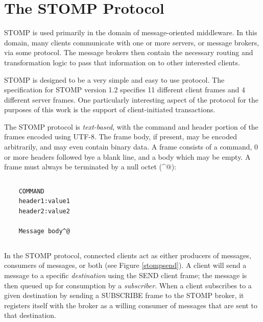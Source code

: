 \documentclass[conference, letterpaper]{IEEEtran}
\begin{document}
\section{The STOMP Protocol}

STOMP is used primarily in the domain of message-oriented middleware. In this domain, many clients
communicate with one or more servers, or message brokers, via some protocol. The message brokers then contain the necessary routing and transformation logic to pass that information on to other interested clients.

STOMP is designed to be a very simple and easy to use protocol. The specification for STOMP version 1.2 specifies 11 different client frames and 4 different server frames. One particularly interesting aspect of the protocol for the purposes of this work is the support of client-initiated transactions.

The STOMP protocol is \textit{text-based}, with the command and header portion of the frames encoded using UTF-8. The frame body, if present, may be encoded arbitrarily, and may even contain binary data. A frame consists of a command, 0 or more headers followed bye a blank line, and a body which may be empty. A frame must always be terminated by a null octet (\^{}@):

\begin{verbatim}
\end{verbatim}
\begin{verbatim}
    COMMAND
    header1:value1
    header2:value2

    Message body^@
\end{verbatim}
\begin{verbatim}
\end{verbatim}

In the STOMP protocol, connected clients act as either producers of messages, consumers of messages, or both (see Figure \ref{stompsend}). A client will send a message to a specific \textit{destination} using the SEND client frame; the message is then queued up for consumption by a \textit{subscriber}. When a client subscribes to a given destination by sending a SUBSCRIBE frame to the STOMP broker, it registers itself with the broker as a willing consumer of messages that are sent to that destination.
\end{document}
